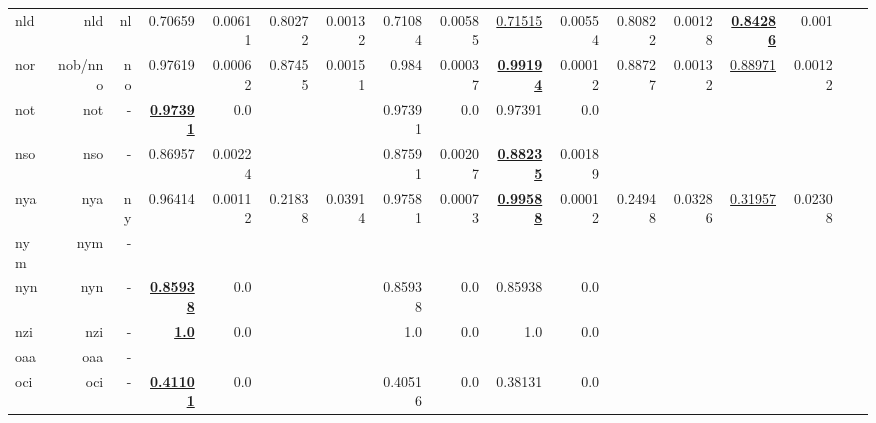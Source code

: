 \documentclass[11pt]{article}
\begin{document}
\begin{table*}[h]
{\begin{tabular}{lrrrrrrrrrrrrrrrr}
nld         & nld         & nl         & 0.70659         & 0.00611         & 0.80272         & 0.00132         & 0.71084         & 0.00585         & \underline{0.71515}         & 0.00554         & 0.80822         & 0.00128         & \textbf{\underline{0.84286}}         & 0.001         \\
nor         & nob/nno         & no         & 0.97619         & 0.00062         & 0.87455         & 0.00151         & 0.984         & 0.00037         & \textbf{\underline{0.99194}}         & 0.00012         & 0.88727         & 0.00132         & \underline{0.88971}         & 0.00122         \\
not         & not         & -         & \textbf{\underline{0.97391}}         & 0.0         &          &          & 0.97391         & 0.0         & 0.97391         & 0.0         &          &          &          &          \\
nso         & nso         & -         & 0.86957         & 0.00224         &          &          & 0.87591         & 0.00207         & \textbf{\underline{0.88235}}         & 0.00189         &          &          &          &          \\
nya         & nya         & ny         & 0.96414         & 0.00112         & 0.21838         & 0.03914         & 0.97581         & 0.00073         & \textbf{\underline{0.99588}}         & 0.00012         & 0.24948         & 0.03286         & \underline{0.31957}         & 0.02308         \\
nym         & nym         & -         &          &          &          &          &          &          &          &          &          &          &          &          \\
nyn         & nyn         & -         & \textbf{\underline{0.85938}}         & 0.0         &          &          & 0.85938         & 0.0         & 0.85938         & 0.0         &          &          &          &          \\
nzi         & nzi         & -         & \textbf{\underline{1.0}}         & 0.0         &          &          & 1.0         & 0.0         & 1.0         & 0.0         &          &          &          &          \\
oaa         & oaa         & -         &          &          &          &          &          &          &          &          &          &          &          &          \\
oci         & oci         & -         & \textbf{\underline{0.41101}}         & 0.0         &          &          & 0.40516         & 0.0         & 0.38131         & 0.0         &          &          &          &          \\

\end{tabular}}
\end{table*}
\end{document}
